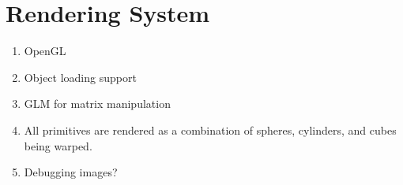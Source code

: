 \section{Rendering System}
\begin{enumerate}
	\item OpenGL
	\item Object loading support
	\item GLM for matrix manipulation
	\item All primitives are rendered as a combination of spheres, cylinders, and cubes being warped. 
	\item Debugging images?
\end{enumerate}